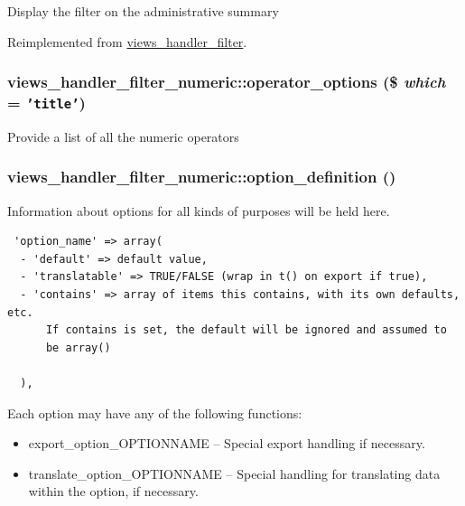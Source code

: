 Display the filter on the administrative summary 

Reimplemented from \hyperlink{classviews__handler__filter_655263cd0b73188eec064b9a9743fe4c}{views\_\-handler\_\-filter}.\hypertarget{classviews__handler__filter__numeric_55335fe026be2bd630638382050626e6}{
\subsubsection[{operator\_\-options}]{\setlength{\rightskip}{0pt plus 5cm}views\_\-handler\_\-filter\_\-numeric::operator\_\-options (\$ {\em which} = {\tt 'title'})}}
\label{classviews__handler__filter__numeric_55335fe026be2bd630638382050626e6}


Provide a list of all the numeric operators \hypertarget{classviews__handler__filter__numeric_a6c2de73a4c7eda8575e1691b8218b3b}{
\subsubsection[{option\_\-definition}]{\setlength{\rightskip}{0pt plus 5cm}views\_\-handler\_\-filter\_\-numeric::option\_\-definition ()}}
\label{classviews__handler__filter__numeric_a6c2de73a4c7eda8575e1691b8218b3b}


Information about options for all kinds of purposes will be held here. 

\begin{Code}\begin{verbatim} 'option_name' => array(
  - 'default' => default value,
  - 'translatable' => TRUE/FALSE (wrap in t() on export if true),
  - 'contains' => array of items this contains, with its own defaults, etc.
      If contains is set, the default will be ignored and assumed to
      be array()

  ),
\end{verbatim}
\end{Code}

 Each option may have any of the following functions:\begin{itemize}
\item export\_\-option\_\-OPTIONNAME -- Special export handling if necessary.\item translate\_\-option\_\-OPTIONNAME -- Special handling for translating data within the option, if necessary. \end{itemize}


